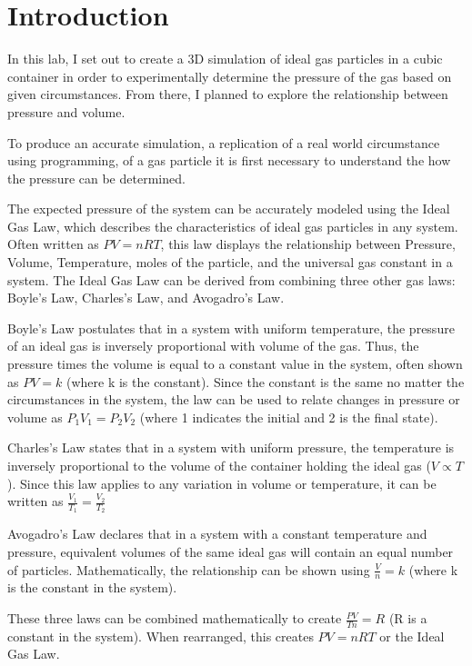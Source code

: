 \documentclass[]{article}
\author{Luke Carlson}
\begin{document}
\newcommand{\truncateit}


\newcommand{\scititle}


\section{Introduction}

In this lab, I set out to create a 3D simulation of ideal gas particles
in a cubic container in order to experimentally determine the pressure
of the gas based on given circumstances. From there, I planned to
explore the relationship between pressure and volume.

To produce an accurate simulation, a replication of a real world
circumstance using programming, of a gas particle it is first necessary
to understand the how the pressure can be determined.

The expected pressure of the system can be accurately modeled using the
Ideal Gas Law, which describes the characteristics of ideal gas
particles in any system. Often written as $PV=nRT$, this law displays
the relationship between Pressure, Volume, Temperature, moles of the
particle, and the universal gas constant in a system. The Ideal Gas Law
can be derived from combining three other gas laws: Boyle's Law,
Charles's Law, and Avogadro's Law.

Boyle's Law postulates that in a system with uniform temperature, the
pressure of an ideal gas is inversely proportional with volume of the
gas. Thus, the pressure times the volume is equal to a constant value in
the system, often shown as $PV = k$ (where k is the constant). Since the
constant is the same no matter the circumstances in the system, the law
can be used to relate changes in pressure or volume as
$P_{1}V_{1} = P_{2}V_{2}$ (where 1 indicates the initial and 2 is the
final state).

Charles's Law states that in a system with uniform pressure, the
temperature is inversely proportional to the volume of the container
holding the ideal gas ($V \propto T$). Since this law applies to any
variation in volume or temperature, it can be written as
$\frac{V_{1}}{T_{1}} = \frac{V_{2}}{T_{2}}$

Avogadro's Law declares that in a system with a constant temperature and
pressure, equivalent volumes of the same ideal gas will contain an equal
number of particles. Mathematically, the relationship can be shown using
$\frac{V}{n} = k$ (where k is the constant in the system).

These three laws can be combined mathematically to create
$\frac{PV}{Tn} = R$ (R is a constant in the system). When rearranged,
this creates $PV=nRT$ or the Ideal Gas Law.
\end{document}
